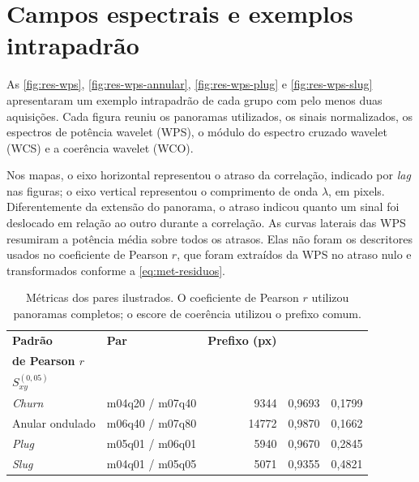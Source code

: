 \section{Campos espectrais e exemplos intrapadrão}\label{sec:res-wps}\label{sec:res-wco}

As \autoref{fig:res-wps}, \autoref{fig:res-wps-annular},
\autoref{fig:res-wps-plug} e \autoref{fig:res-wps-slug} apresentaram um exemplo
intrapadrão de cada grupo com pelo menos duas aquisições. Cada figura reuniu os panoramas utilizados,
os sinais normalizados, os espectros de potência wavelet (WPS), o módulo do espectro
cruzado wavelet (WCS) e a coerência wavelet (WCO).

Nos mapas, o eixo horizontal representou o atraso da correlação, indicado por \textit{lag}
nas figuras; o eixo vertical representou o comprimento de onda $\lambda$, em pixels.
Diferentemente da extensão do panorama, o atraso indicou quanto um sinal foi
deslocado em relação ao outro durante a correlação. As curvas laterais das WPS
resumiram a potência média sobre todos os atrasos. Elas não foram os descritores usados
no coeficiente de Pearson $r$, que foram extraídos da WPS no atraso nulo e
transformados conforme a \autoref{eq:met-residuos}.

\begin{table}[htbp]
  \centering
  \caption{Métricas dos pares ilustrados. O coeficiente de Pearson $r$ utilizou
  panoramas completos; o escore de coerência utilizou o prefixo comum.}
  \label{tab:res-exemplos}
  \small
  \setlength{\tabcolsep}{5pt}
  \begin{tabular}{l l r r r}
    \hline
    \textbf{Padrão} & \textbf{Par} & \textbf{Prefixo (px)} &
    \shortstack{\textbf{Coeficiente}\\\textbf{de Pearson $r$}} &
    \shortstack{\textbf{Escore de coerência}\\$S_{xy}^{(0{,}05)}$}\\
    \hline
    \textit{Churn} & m04q20 / m07q40 & 9344 & 0,9693 & 0,1799\\
    Anular ondulado & m06q40 / m07q80 & 14772 & 0,9870 & 0,1662\\
    \textit{Plug} & m05q01 / m06q01 & 5940 & 0,9670 & 0,2845\\
    \textit{Slug} & m04q01 / m05q05 & 5071 & 0,9355 & 0,4821\\
    \hline
  \end{tabular}
\end{table}

